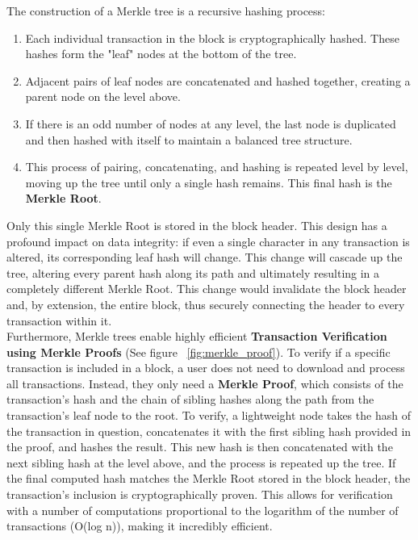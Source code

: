 \documentclass{scrbook}
\begin{document}
The construction of a Merkle tree is a recursive hashing process:

\begin{enumerate}
    \item Each individual transaction in the block is cryptographically hashed. These hashes form the "leaf" nodes at the bottom of the tree.
    \item Adjacent pairs of leaf nodes are concatenated and hashed together, creating a parent node on the level above.
    \item If there is an odd number of nodes at any level, the last node is duplicated and then hashed with itself to maintain a balanced tree structure.
    \item This process of pairing, concatenating, and hashing is repeated level by level, moving up the tree until only a single hash remains. This final hash is the \textbf{Merkle Root}.
\end{enumerate}

Only this single Merkle Root is stored in the block header. This design has a profound impact on data integrity: if even a single character in any transaction is altered, its corresponding leaf hash will change. This change will cascade up the tree, altering every parent hash along its path and ultimately resulting in a completely different Merkle Root. This change would invalidate the block header and, by extension, the entire block, thus securely connecting the header to every transaction within it.\\

Furthermore, Merkle trees enable highly efficient \textbf{Transaction Verification using Merkle Proofs} (See figure ~\ref{fig:merkle_proof}). To verify if a specific transaction is included in a block, a user does not need to download and process all transactions. Instead, they only need a \textbf{Merkle Proof}, which consists of the transaction’s hash and the chain of sibling hashes along the path from the transaction's leaf node to the root. To verify, a lightweight node takes the hash of the transaction in question, concatenates it with the first sibling hash provided in the proof, and hashes the result. This new hash is then concatenated with the next sibling hash at the level above, and the process is repeated up the tree. If the final computed hash matches the Merkle Root stored in the block header, the transaction's inclusion is cryptographically proven. This allows for verification with a number of computations proportional to the logarithm of the number of transactions (O(log n)), making it incredibly efficient.\\
\end{document}
